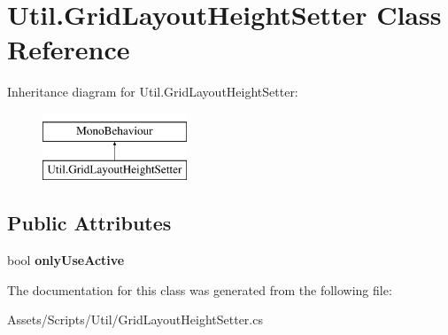 \hypertarget{class_util_1_1_grid_layout_height_setter}{}\section{Util.\+Grid\+Layout\+Height\+Setter Class Reference}
\label{class_util_1_1_grid_layout_height_setter}
Inheritance diagram for Util.\+Grid\+Layout\+Height\+Setter\+:\begin{figure}[H]
\begin{center}
\leavevmode
\includegraphics[height=2.000000cm]{class_util_1_1_grid_layout_height_setter}
\end{center}
\end{figure}
\subsection*{Public Attributes}
\begin{DoxyCompactItemize}
\item 
bool {\bfseries only\+Use\+Active}\hypertarget{class_util_1_1_grid_layout_height_setter_aee87be52cfc38b73cf5bbc7d2a1cf1a6}{}\label{class_util_1_1_grid_layout_height_setter_aee87be52cfc38b73cf5bbc7d2a1cf1a6}

\end{DoxyCompactItemize}


The documentation for this class was generated from the following file\+:\begin{DoxyCompactItemize}
\item 
Assets/\+Scripts/\+Util/Grid\+Layout\+Height\+Setter.\+cs\end{DoxyCompactItemize}
